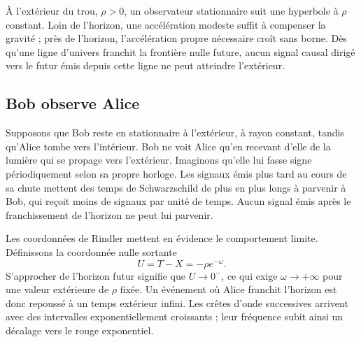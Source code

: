 À l’extérieur du trou, \(\rho>0\), un observateur stationnaire suit une hyperbole à \(\rho\) constant. Loin de l’horizon, une accélération modeste suffit à compenser la gravité ; près de l’horizon, l’accélération propre nécessaire croît sans borne. Dès qu’une ligne d’univers franchit la frontière nulle future, aucun signal causal dirigé vers le futur émis depuis cette ligne ne peut atteindre l’extérieur.

\begin{classroomqa}
\end{classroomqa}

\begin{classroomqa}
\end{classroomqa}

\subsection{Bob observe Alice}

Supposons que Bob reste en stationnaire à l’extérieur, à rayon constant, tandis qu’Alice tombe vers l’intérieur. Bob ne voit Alice qu’en recevant d’elle de la lumière qui se propage vers l’extérieur. Imaginons qu’elle lui fasse signe périodiquement selon sa propre horloge. Les signaux émis plus tard au cours de sa chute mettent des temps de Schwarzschild de plus en plus longs à parvenir à Bob, qui reçoit moins de signaux par unité de temps. Aucun signal émis après le franchissement de l’horizon ne peut lui parvenir.

Les coordonnées de Rindler mettent en évidence le comportement limite. Définissons la coordonnée nulle sortante
\begin{equation}
U=T-X=-\rho e^{-\omega}.
\end{equation}
S’approcher de l’horizon futur signifie que \(U\to0^{-}\), ce qui exige \(\omega\to+\infty\) pour une valeur extérieure de \(\rho\) fixée. Un événement où Alice franchit l’horizon est donc repoussé à un temps extérieur infini. Les crêtes d’onde successives arrivent avec des intervalles exponentiellement croissants ; leur fréquence subit ainsi un décalage vers le rouge exponentiel.

